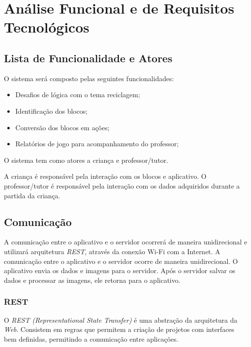 
\section{Análise Funcional e de Requisitos Tecnológicos}

    \subsection{Lista de Funcionalidade e Atores}
    O sistema será composto  pelas seguintes funcionalidades:
    \begin{itemize}
        \item Desafios de lógica com o tema reciclagem;
        \item Identificação dos blocos;
        \item Conversão dos blocos em ações;
        \item Relatórios de jogo para acompanhamento do professor;
    \end{itemize}
    
    O sistema tem como atores a criança e professor/tutor.
    
    A criança é responsável pela interação com os blocos e aplicativo.
    O professor/tutor é responsável pela interação com os dados adquiridos durante a partida da criança.
    
    \subsection{Comunicação}
    A comunicação entre o aplicativo e o servidor ocorrerá de maneira unidirecional e utilizará arquitetura \textit{REST}, através da conexão Wi-Fi com a Internet.
    A comunicação entre o aplicativo e o servidor ocorre de maneira unidirecional. 
    O aplicativo envia os dados e imagens para o servidor. Após o servidor salvar os dados e processar as imagens, ele retorna para o aplicativo.
    
    \subsubsection{REST}
    O \textit{REST (Representational State Transfer)} é uma abstração da arquitetura da \textit{Web}. Consistem em regras que permitem a criação de projetos com interfaces bem definidas, permitindo a comunicação entre aplicações.
    
